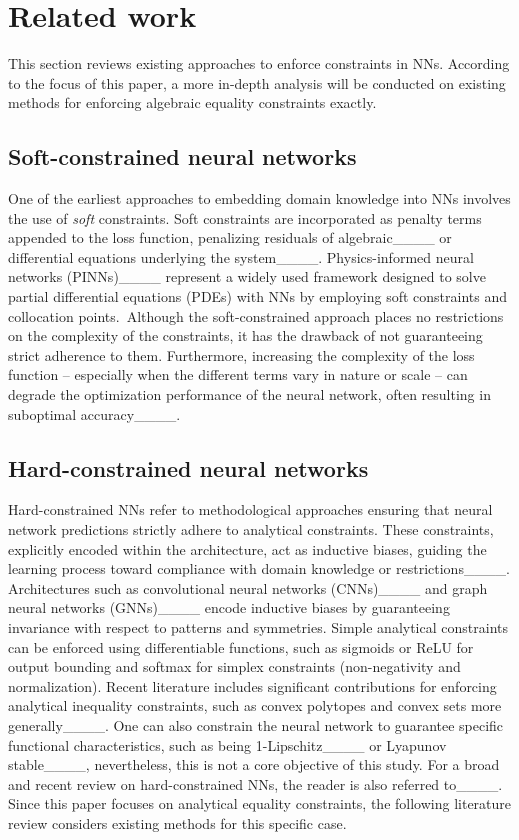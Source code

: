 \section{Related work}
\label{sec:related-work}
This section reviews existing approaches to enforce constraints in NNs. According to the focus of this paper, a more in-depth analysis will be conducted on existing methods for enforcing algebraic equality constraints exactly.

\subsection{Soft-constrained neural networks}
One of the earliest approaches to embedding domain knowledge into NNs involves the use of \textit{soft} constraints. Soft constraints are incorporated as penalty terms appended to the loss function, penalizing residuals of algebraic____ or differential equations underlying the system____. Physics-informed neural networks (PINNs)____ represent a widely used framework designed to solve partial differential equations (PDEs) with NNs by employing soft constraints and collocation points.\ Although the soft-constrained approach places no restrictions on the complexity of the constraints, it has the drawback of not guaranteeing strict adherence to them. Furthermore, increasing the complexity of the loss function -- especially when the different terms vary in nature or scale -- can degrade the optimization performance of the neural network, often resulting in suboptimal accuracy____.

\subsection{Hard-constrained neural networks}
\label{subsec:related-work-hard}
Hard-constrained NNs refer to methodological approaches ensuring that neural network predictions strictly adhere to analytical constraints. These constraints, explicitly encoded within the architecture, act as inductive biases, guiding the learning process toward compliance with domain knowledge or restrictions____. Architectures such as convolutional neural networks (CNNs)____ and graph neural networks (GNNs)____ encode inductive biases by guaranteeing invariance with respect to patterns and symmetries. Simple analytical constraints can be enforced using differentiable functions, such as sigmoids or ReLU for output bounding and softmax for simplex constraints (non-negativity and normalization). Recent literature includes significant contributions for enforcing analytical inequality constraints, such as convex polytopes and convex sets more generally____. One can also constrain the neural network to guarantee specific functional characteristics, such as being 1-Lipschitz____ or Lyapunov stable____, nevertheless, this is not a core objective of this study. For a broad and recent review on hard-constrained NNs, the reader is also referred to____.\\
Since this paper focuses on analytical equality constraints, the following literature review considers existing methods for this specific case. 

